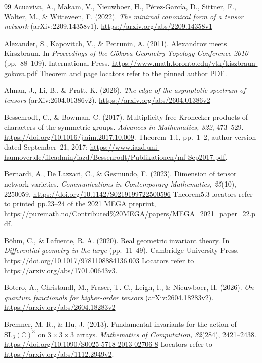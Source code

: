 \begin{thebibliography}{99}
Acuaviva, A., Makam, V., Nieuwboer, H., P\'erez-Garc\'ia, D.,
Sittner, F., Walter, M., \& Witteveen, F. (2022).
\emph{The minimal canonical form of a tensor network}
(arXiv:2209.14358v1). \url{https://arxiv.org/abs/2209.14358v1}

Alexander, S., Kapovitch, V., \& Petrunin, A. (2011).
Alexandrov meets Kirszbraun. In \emph{Proceedings of the G\"okova
Geometry-Topology Conference 2010} (pp.~88--109). International Press.
\url{https://www.math.toronto.edu/vtk/kiszbraun-gokova.pdf}
Theorem and page locators refer to the pinned author PDF.

Alman, J., Li, B., \& Pratt, K. (2026).
\emph{The edge of the asymptotic spectrum of tensors}
(arXiv:2604.01386v2). \url{https://arxiv.org/abs/2604.01386v2}

Bessenrodt, C., \& Bowman, C. (2017).
Multiplicity-free Kronecker products of characters of the symmetric groups.
\emph{Advances in Mathematics, 322}, 473--529.
\url{https://doi.org/10.1016/j.aim.2017.10.009}.
Theorem~1.1, pp.~1--2, author version dated September~21, 2017:
\url{https://www.iazd.uni-hannover.de/fileadmin/iazd/Bessenrodt/Publikationen/mf-Sep2017.pdf}.

Bernardi, A., De Lazzari, C., \& Gesmundo, F. (2023).
Dimension of tensor network varieties.
\emph{Communications in Contemporary Mathematics, 25}(10), 2250059.
\url{https://doi.org/10.1142/S0219199722500596}
Theorem5.3 locators refer to printed pp.23--24 of the 2021 MEGA preprint,
\url{https://puremath.no/Contributed\%20MEGA/papers/MEGA_2021_paper_22.pdf}.

B\"ohm, C., \& Lafuente, R. A. (2020).
Real geometric invariant theory. In \emph{Differential geometry in
the large} (pp.~11--49). Cambridge University Press.
\url{https://doi.org/10.1017/9781108884136.003}
Locators refer to \url{https://arxiv.org/abs/1701.00643v3}.

Botero, A., Christandl, M., Fraser, T. C., Leigh, I., \& Nieuwboer, H. (2026).
\emph{On quantum functionals for higher-order tensors}
(arXiv:2604.18283v2). \url{https://arxiv.org/abs/2604.18283v2}

Bremner, M. R., \& Hu, J. (2013).
Fundamental invariants for the action of $\mathrm{SL}_3(\mathbb C)^3$
on $3\times3\times3$ arrays.
\emph{Mathematics of Computation, 82}(284), 2421--2438.
\url{https://doi.org/10.1090/S0025-5718-2013-02706-8}
Locators refer to \url{https://arxiv.org/abs/1112.2949v2}.


\end{thebibliography}
